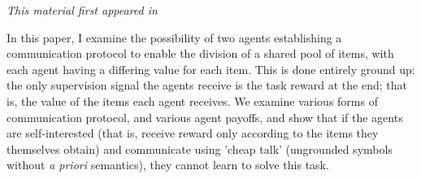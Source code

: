 \textit{This material first appeared in \citet{Cao:18}}

In this paper, I examine the possibility of two agents establishing a communication protocol to enable the division of a shared pool of items, with each agent having a differing value for each item. This is done entirely ground up: the only supervision signal the agents receive is the task reward at the end; that is, the value of the items each agent receives. We examine various forms of communication protocol, and various agent payoffs, and show that if the agents are self-interested (that is, receive reward only according to the items they themselves obtain) and communicate using 'cheap talk' (ungrounded symbols without \textit{a priori} semantics), they cannot learn to solve this task.